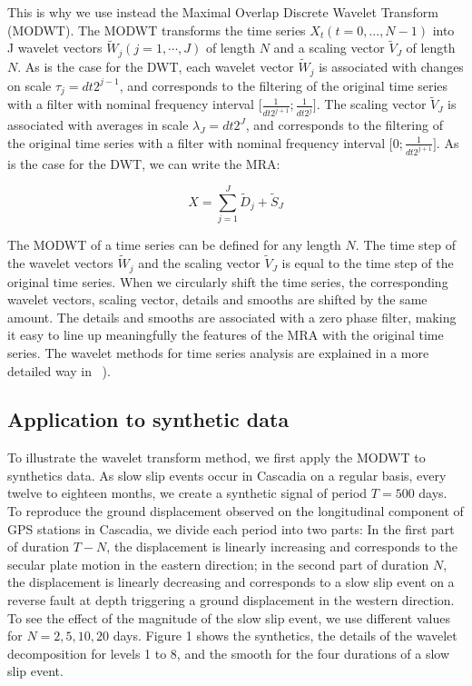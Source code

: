 \documentclass[draft]{agujournal2018}
\begin{document}
This is why we use instead the Maximal Overlap Discrete Wavelet Transform (MODWT). The MODWT transforms the time series $X_t \left( t = 0, ... , N - 1 \right)$ into J wavelet vectors $\widetilde{W}_j \left( j = 1 ,  \cdots , J \right)$ of length $N$ and a scaling vector $\widetilde{V}_J$ of length $N$. As is the case for the DWT, each wavelet vector $\widetilde{W}_j$ is associated with changes on scale $\tau_j = dt 2^{j - 1}$, and corresponds to the filtering of the original time series with a filter with nominal frequency interval $\lbrack \frac{1}{dt 2^{j + 1}} ; \frac{1}{dt 2^j} \rbrack$. The scaling vector $\widetilde{V}_J$ is associated with averages in scale $\lambda_J = dt 2^J$, and corresponds to the filtering of the original time series with a filter with nominal frequency interval $\lbrack 0 ; \frac{1}{dt 2^{j + 1}} \rbrack$. As is the case for the DWT, we can write the MRA:

\begin{linenomath*}
\begin{equation}
X = \sum_{j = 1}^{J} \widetilde{D}_j + \widetilde{S}_J
\end{equation}
\end{linenomath*}

The MODWT of a time series can be defined for any length $N$. The time step of the wavelet vectors $\widetilde{W}_j$ and the scaling vector $\widetilde{V}_J$ is equal to the time step of the original time series. When we circularly shift the time series, the corresponding wavelet vectors, scaling vector, details and smooths are shifted by the same amount. The details and smooths are associated with a zero phase filter, making it easy to line up meaningfully the features of the MRA with the original time series. The wavelet methods for time series analysis are explained in a more detailed way in ~\citet{PER_2000}). \\

\subsection{Application to synthetic data}

To illustrate the wavelet transform method, we first apply the MODWT to synthetics data. As slow slip events occur in Cascadia on a regular basis, every twelve to eighteen months, we create a synthetic signal of period $T = 500$ days. To reproduce the ground displacement observed on the longitudinal component of GPS stations in Cascadia, we divide each period into two parts: In the first part of duration $T - N$, the displacement is linearly increasing and corresponds to the secular plate motion in the eastern direction; in the second part of duration $N$, the displacement is linearly decreasing and corresponds to a slow slip event on a reverse fault at depth triggering a ground displacement in the western direction. To see the effect of the magnitude of the slow slip event, we use different values for $N = 2, 5, 10, 20$ days. Figure 1 shows the synthetics, the details of the wavelet decomposition for levels 1 to 8, and the smooth for the four durations of a slow slip event. \\
\end{document}
